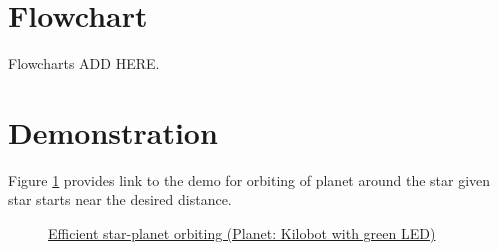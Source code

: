 \documentclass{report}[12pt]
\begin{document}
\section{Flowchart}
Flowcharts ADD HERE.
\section{Demonstration}
Figure \ref{fig:efficient_star_planet_orbiting} provides link to the demo for orbiting of planet around the star given star starts near the desired distance.
\begin{figure}[H]
    \centering
    \caption{\href{https://youtu.be/LRgOzhAJI1k}{Efficient star-planet orbiting (Planet: Kilobot with green LED)}}
    \label{fig:efficient_star_planet_orbiting}
\end{figure}

\end{document}
